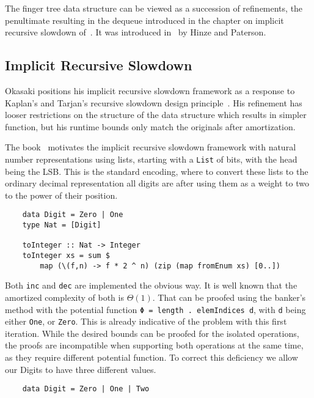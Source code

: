 The finger tree data structure can be viewed as a succession of refinements, the penultimate resulting in the dequeue introduced in the chapter on implicit recursive slowdown of~\cite{okasaki1999purely}. It was introduced in~\cite{hinze_paterson_2006} by Hinze and Paterson.

\subsection{Implicit Recursive Slowdown}

Okasaki positions his implicit recursive slowdown framework as a response to Kaplan's and Tarjan's recursive slowdown design principle~\cite{Kaplan:1995:PLC:225058.225090}. His refinement has looser restrictions on the structure of the data structure which results in simpler function, but his runtime bounds only match the originals after amortization.\par
The book~\cite{okasaki1999purely} motivates the  implicit recursive slowdown framework with natural number representations using lists, starting with a \texttt{List} of bits, with the head being the LSB\@. This is the standard encoding, where to convert these lists to the ordinary decimal representation all digits are after using them as a weight to two to the power of their position.
\begin{verbatim}
    data Digit = Zero | One
    type Nat = [Digit]

    toInteger :: Nat -> Integer
    toInteger xs = sum $
        map (\(f,n) -> f * 2 ^ n) (zip (map fromEnum xs) [0..])
\end{verbatim}
Both \texttt{inc} and \texttt{dec} are implemented the obvious way. It is well known that the amortized complexity of both is \(\Theta(1)\). That can be proofed using the banker's method with the potential function \texttt{Φ = length . elemIndices d}, with \texttt{d} being either \texttt{One}, or \texttt{Zero}. This is already indicative of the problem with this first iteration. While the desired bounds can be proofed for the isolated operations, the proofs are incompatible when supporting both operations at the same time, as they require different potential function. To correct this deficiency we allow our Digits to have three different values.
\begin{verbatim}
    data Digit = Zero | One | Two
\end{verbatim}
